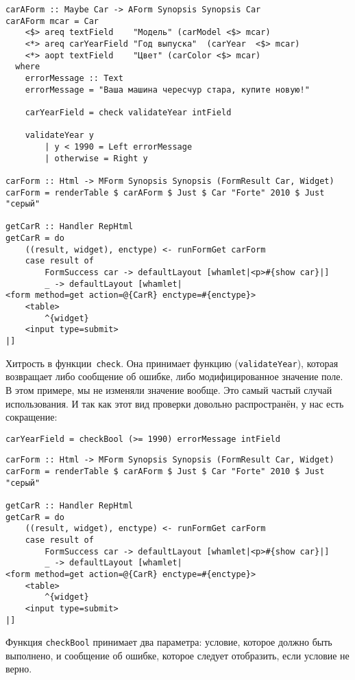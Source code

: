 \begin{lstlisting}
carAForm :: Maybe Car -> AForm Synopsis Synopsis Car
carAForm mcar = Car
    <$> areq textField    "Модель" (carModel <$> mcar)
    <*> areq carYearField "Год выпуска"  (carYear  <$> mcar)
    <*> aopt textField    "Цвет" (carColor <$> mcar)
  where
    errorMessage :: Text
    errorMessage = "Ваша машина чересчур стара, купите новую!"

    carYearField = check validateYear intField

    validateYear y
        | y < 1990 = Left errorMessage
        | otherwise = Right y

carForm :: Html -> MForm Synopsis Synopsis (FormResult Car, Widget)
carForm = renderTable $ carAForm $ Just $ Car "Forte" 2010 $ Just "серый"

getCarR :: Handler RepHtml
getCarR = do
    ((result, widget), enctype) <- runFormGet carForm
    case result of
        FormSuccess car -> defaultLayout [whamlet|<p>#{show car}|]
        _ -> defaultLayout [whamlet|
<form method=get action=@{CarR} enctype=#{enctype}>
    <table>
        ^{widget}
    <input type=submit>
|]
\end{lstlisting}

Хитрость в функции~\lstinline'check'. Она принимает функцию
(\lstinline'validateYear'), которая возвращает либо сообщение об ошибке, либо
модифицированное значение поле. В этом примере, мы не изменяли значение
вообще. Это самый частый случай использования. И так как этот вид проверки
довольно распространён, у нас есть сокращение:

\begin{lstlisting}
carYearField = checkBool (>= 1990) errorMessage intField
\end{lstlisting}

\begin{lstlisting}
carForm :: Html -> MForm Synopsis Synopsis (FormResult Car, Widget)
carForm = renderTable $ carAForm $ Just $ Car "Forte" 2010 $ Just "серый"

getCarR :: Handler RepHtml
getCarR = do
    ((result, widget), enctype) <- runFormGet carForm
    case result of
        FormSuccess car -> defaultLayout [whamlet|<p>#{show car}|]
        _ -> defaultLayout [whamlet|
<form method=get action=@{CarR} enctype=#{enctype}>
    <table>
        ^{widget}
    <input type=submit>
|]
\end{lstlisting}

Функция \lstinline'checkBool' принимает два параметра: условие, которое должно
быть выполнено, и сообщение об ошибке, которое следует отобразить, если
условие не верно.

